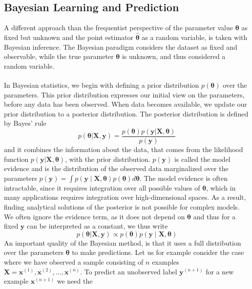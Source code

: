 \subsection{Bayesian Learning and Prediction}
A different approach than the frequentist perspective of the parameter value $\boldsymbol{\theta}$ as fixed but unknown and the point estimator $\hat{\boldsymbol{\theta}}$ as a random variable, is taken with Bayesian inference. The Bayesian paradigm considers the dataset as fixed and observable, while the true parameter $\boldsymbol{\theta}$ is unknown, and thus considered a random variable. 
\\
\\
In Bayesian statistics, we begin with defining a prior distribution $p(\boldsymbol{\theta})$ over the parameters. This prior distribution expresses our initial view on the parameters, before any data has been observed. When data becomes available, we update our prior distribution to a posterior distribution. The posterior distribution is defined by Bayes' rule
\begin{equation*}
         p(\boldsymbol{\theta}|\boldsymbol{X},\boldsymbol{y})=\frac{p(\boldsymbol{\theta})p(\boldsymbol{y}|\boldsymbol{X},\boldsymbol{\theta})}{p(\boldsymbol{y})}
\end{equation*}
and it combines the information about the data, that comes from the likelihood function $p(\boldsymbol{y}|\boldsymbol{X},\boldsymbol{\theta})$, with the prior distribution. $p(\boldsymbol{y})$ is called the model evidence and is the distribution of the observed data marginalized over the parameters $p(\boldsymbol{y})=\int p(\boldsymbol{y}\mid \boldsymbol{X}, \boldsymbol{\theta})p(\boldsymbol{\theta})d\boldsymbol{\theta}$. The model evidence is often intractable, since it requires integration over all possible values of $\boldsymbol{\theta}$, which in many applications requires integration over high-dimensional spaces. As a result, finding analytical solutions of the posterior is not possible for complex models. 
We often ignore the evidence term, as it does not depend on $\boldsymbol{\theta}$ and thus for a fixed $\boldsymbol{y}$ can be interpreted as a constant, we thus write
\begin{equation} \label{eq:posterior}
    p(\boldsymbol{\theta}|\boldsymbol{X},\boldsymbol{y})\propto p(\boldsymbol{\theta})p(\boldsymbol{y}\mid \boldsymbol{X},\boldsymbol{\theta})
\end{equation}
An important quality of the Bayesian method, is that it uses a full distribution over the parameters $\boldsymbol{\theta}$ to make predictions. Let us for example consider the case where we have observed a sample consisting of $n$ examples $\boldsymbol{X}=\boldsymbol{x}^{(1)}, \boldsymbol{x}^{(2)},\ldots, \boldsymbol{x}^{(n)}$. To predict an unobserved label $\boldsymbol{y}^{(n+1)}$ for a new example $\boldsymbol{x}^{(n+1)}$ we need the 
